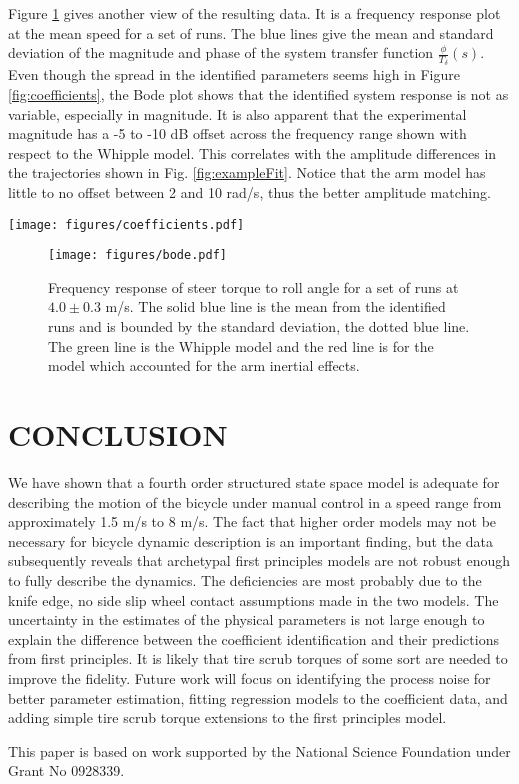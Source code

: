 \documentclass[twocolumn,10pt]{asme2e}
\begin{document}
Figure \ref{fig:bode} gives another view of the resulting data. It is a
frequency response plot at the mean speed for a set of runs. The blue lines
give the mean and standard deviation of the magnitude and phase of the system
transfer function \(\frac{\phi}{T_\delta}(s)\). Even though the spread in the
identified parameters seems high in Figure \ref{fig:coefficients}, the Bode
plot shows that the identified system response is not as variable, especially
in magnitude.  It is also apparent that the experimental magnitude has a -5 to
-10 dB offset across the frequency range shown with respect to the Whipple
model. This correlates with the amplitude differences in the trajectories shown
in Fig. \ref{fig:exampleFit}. Notice that the arm model has little to no offset
between 2 and 10 rad/s, thus the better amplitude matching.
%
\begin{figure*}
	\texttt{[image: figures/coefficients.pdf]}
	\caption{Coefficients of the linear dynamical equations of motion plotted
	as a function of speed. Each blue dot is a single experiment. The green line
	is the Whipple model and the red line is the arm model. Only experiments
	with a mean fit percentage greater than zero are shown.}
	\label{fig:coefficients}
\end{figure*}
%
\begin{figure}
	\texttt{[image: figures/bode.pdf]}
	\caption{Frequency response of steer torque to roll angle for a set of runs
	at $4.0 \pm 0.3$ m/s. The solid blue line is the mean from the identified
	runs and is bounded by the standard deviation, the dotted blue line. The
	green line is the Whipple model and the red line is for the model which
	accounted for the arm inertial effects.}
	\label{fig:bode}
\end{figure}
%
\section*{CONCLUSION}
We have shown that a fourth order structured state space model is adequate for
describing the motion of the bicycle under manual control in a speed range from
approximately 1.5 m/s to 8 m/s. The fact that higher order models may not be
necessary for bicycle dynamic description is an important finding, but the data
subsequently reveals that archetypal first principles models are not robust
enough to fully describe the dynamics. The deficiencies are most probably due
to the knife edge, no side slip wheel contact assumptions made in the two
models. The uncertainty in the estimates of the physical parameters is not
large enough to explain the difference between the coefficient identification
and their predictions from first principles. It is likely that tire scrub
torques of some sort are needed to improve the fidelity. Future work will
focus on identifying the process noise for better parameter estimation, fitting
regression models to the coefficient data, and adding simple tire scrub torque
extensions to the first principles model.

\begin{acknowledgment}
	This paper is based on work supported by the National Science Foundation
	under Grant No 0928339.
\end{acknowledgment}



\end{document}
